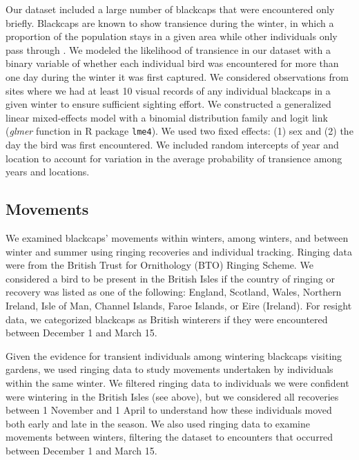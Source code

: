 \documentclass[a4paper, twoside]{templates/ociamthesis}
\begin{document}
Our dataset included a large number of blackcaps that were encountered only briefly. Blackcaps are known to show transience during the winter, in which a proportion of the population stays in a given area while other individuals only pass through \autocite{beldaResidentTransientDynamics2007,cuadradoYearYearRecurrence1992}. We modeled the likelihood of transience in our dataset with a binary variable of whether each individual bird was encountered for more than one day during the winter it was first captured. We considered observations from sites where we had at least 10 visual records of any individual blackcaps in a given winter to ensure sufficient sighting effort. We constructed a generalized linear mixed-effects model with a binomial distribution family and logit link (\emph{glmer} function in R package \texttt{lme4}). We used two fixed effects: (1) sex and (2) the day the bird was first encountered. We included random intercepts of year and location to account for variation in the average probability of transience among years and locations.

\hypertarget{movements}{%
\subsection{Movements}\label{movements}}

We examined blackcaps' movements within winters, among winters, and between winter and summer using ringing recoveries and individual tracking. Ringing data were from the British Trust for Ornithology (BTO) Ringing Scheme. We considered a bird to be present in the British Isles if the country of ringing or recovery was listed as one of the following: England, Scotland, Wales, Northern Ireland, Isle of Man, Channel Islands, Faroe Islands, or Eire (Ireland). For resight data, we categorized blackcaps as British winterers if they were encountered between December 1 and March 15.

Given the evidence for transient individuals among wintering blackcaps visiting gardens, we used ringing data to study movements undertaken by individuals within the same winter. We filtered ringing data to individuals we were confident were wintering in the British Isles (see above), but we considered all recoveries between 1 November and 1 April to understand how these individuals moved both early and late in the season. We also used ringing data to examine movements between winters, filtering the dataset to encounters that occurred between December 1 and March 15.
\end{document}
